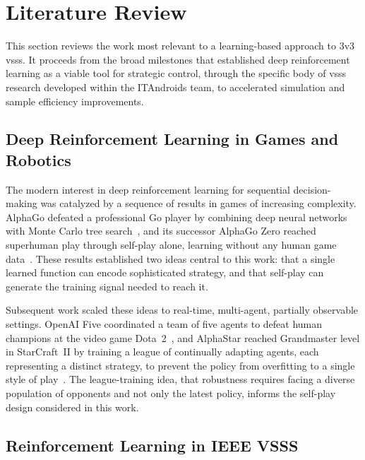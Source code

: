\section{Literature Review}

This section reviews the work most relevant to a learning-based approach to
3v3 \gls{vsss}.  It proceeds from the broad milestones that established deep
reinforcement learning as a viable tool for strategic control, through the
specific body of \gls{vsss} research developed within the ITAndroids team, to
accelerated simulation and sample efficiency improvements.

\subsection{Deep Reinforcement Learning in Games and Robotics}

The modern interest in deep reinforcement learning for sequential
decision-making was catalyzed by a sequence of results in games of increasing
complexity.  AlphaGo defeated a professional Go player by combining
deep neural networks with Monte Carlo tree search~\cite{silver2016mastering},
and its successor AlphaGo Zero reached superhuman play through self-play
alone, learning without any human game data~\cite{silver2017mastering}.  These
results established two ideas central to this work: that a single learned
function can encode sophisticated strategy, and that self-play can generate the
training signal needed to reach it.

Subsequent work scaled these ideas to real-time, multi-agent, partially
observable settings.  OpenAI Five coordinated a team of five agents to defeat
human champions at the video game Dota~2~\cite{berner2019dota}, and AlphaStar
reached Grandmaster level in StarCraft~II by training a league of continually
adapting agents, each representing a distinct strategy, to prevent the policy
from overfitting to a single style of play~\cite{starcraft_marl}.  The
league-training idea, that robustness requires facing a diverse
population of opponents and not only the latest policy, informs
the self-play design considered in this work.

\subsection{Reinforcement Learning in IEEE VSSS}

